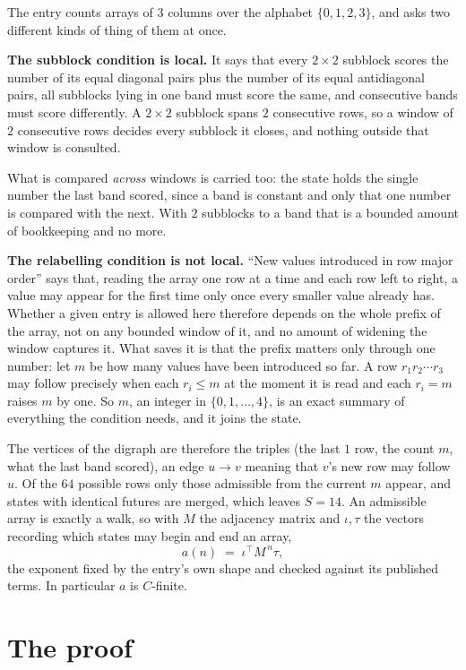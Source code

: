 \documentclass[11pt,a4paper]{article}
\theoremstyle{plain}
\theoremstyle{definition}
\begin{document}
The entry counts arrays of 3 columns over the alphabet $\{0,1,2,3\}$, and asks two different kinds of thing of them at once.

\textbf{The subblock condition is local.} It says that every $2\times2$ subblock scores the number of its equal diagonal pairs plus the number of its equal antidiagonal pairs, all subblocks lying in one band must score the same, and consecutive bands must score differently. A $ 2\times2$ subblock spans $2$ consecutive rows, so a window of $2$ consecutive rows decides every subblock it closes, and nothing outside that window is consulted.

What is compared \emph{across} windows is carried too: the state holds the single number the last band scored, since a band is constant and only that one number is compared with the next. With $2$ subblocks to a band that is a bounded amount of bookkeeping and no more.

\textbf{The relabelling condition is not local.} ``New values introduced in row major order'' says that, reading the array one row at a time and each row left to right, a value may appear for the first time only once every smaller value already has. Whether a given entry is allowed here therefore depends on the whole prefix of the array, not on any bounded window of it, and no amount of widening the window captures it. What saves it is that the prefix matters only through one number: let $m$ be how many values have been introduced so far. A row $r_1r_2\cdots r_3$ may follow precisely when each $r_i\le m$ at the moment it is read and each $r_i=m$ raises $m$ by one. So $m$, an integer in $\{0,1,\dots,4\}$, is an exact summary of everything the condition needs, and it joins the state.

The vertices of the digraph are therefore the triples (the last $1$ row, the count $m$, what the last band scored), an edge $u\to v$ meaning that $v$'s new row may follow $u$. Of the $64$ possible rows only those admissible from the current $m$ appear, and states with identical futures are merged, which leaves $S=14$. An admissible array is exactly a walk, so with $M$ the adjacency matrix and $\iota,\tau$ the vectors recording which states may begin and end an array,
\[
a(n)\;=\;\iota^{\!\top}M^{\,n}\tau ,
\]
the exponent fixed by the entry's own shape and checked against its published terms. In
particular $a$ is $C$-finite.

\section{The proof}
\end{document}
